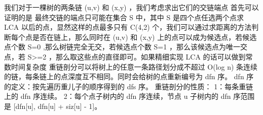 \markdownRendererInterblockSeparator
{}我们对于一棵树的两条链\markdownRendererDollarSign{} (u,v) \markdownRendererDollarSign{}和\markdownRendererDollarSign{} (x,y) \markdownRendererDollarSign{}，我们考虑求出它们的交链端点\markdownRendererParagraphSeparator
{}首先可以证明的是 最终交链的端点只可能在集合\markdownRendererDollarSign{} S \markdownRendererDollarSign{}中，其中\markdownRendererDollarSign{} S \markdownRendererDollarSign{}是四个点任选两个点求\markdownRendererDollarSign{} LCA \markdownRendererDollarSign{}以后的点，显然这样的点最多只有\markdownRendererDollarSign{} C(4,2) \markdownRendererDollarSign{}个，我们可以通过求距离的方法判断每个点是否在链上，那么同时在\markdownRendererDollarSign{} (u,v) \markdownRendererDollarSign{}和\markdownRendererDollarSign{} (x,y) \markdownRendererDollarSign{}上的点可以成为候选点，若候选点个数\markdownRendererDollarSign{} \markdownRendererPipe{}S\markdownRendererPipe{}=0 \markdownRendererDollarSign{},那么树链完全无交，若候选点个数\markdownRendererDollarSign{} \markdownRendererPipe{}S\markdownRendererPipe{}=1 \markdownRendererDollarSign{}，那么该候选点为唯一交点，若\markdownRendererDollarSign{} \markdownRendererPipe{}S\markdownRendererPipe{}>=2 \markdownRendererDollarSign{}，那么取这些点的直径即可。如果精细实现\markdownRendererDollarSign{} LCA \markdownRendererDollarSign{}的话可以做到常数时间复杂度\markdownRendererInterblockSeparator
{}\markdownRendererInterblockSeparator
{}
\markdownRendererSectionEnd \markdownRendererSectionBegin
{}\markdownRendererInterblockSeparator
{}重链剖分可以将树上的任意一条路径划分成不超过 \markdownRendererDollarSign{}O(\markdownRendererBackslash{}log n)\markdownRendererDollarSign{} 条连续的链，每条链上的点深度互不相同。同时会给树的点重新编号为 \markdownRendererDollarSign{}dfn\markdownRendererDollarSign{} 序。\markdownRendererParagraphSeparator
{}\markdownRendererDollarSign{}dfn\markdownRendererDollarSign{} 序的定义：按先遍历重儿子的顺序得到的 \markdownRendererDollarSign{}dfs\markdownRendererDollarSign{} 序。\markdownRendererParagraphSeparator
{}重链剖分的性质：\markdownRendererParagraphSeparator
{}1：每条重链上的 \markdownRendererDollarSign{}dfn\markdownRendererDollarSign{} 序连续。\markdownRendererHardLineBreak
{}2：每个点子树内的 \markdownRendererDollarSign{}dfn\markdownRendererDollarSign{} 序连续，节点 \markdownRendererDollarSign{}u\markdownRendererDollarSign{} 子树内的 \markdownRendererDollarSign{}dfn\markdownRendererDollarSign{} 序范围是 \markdownRendererDollarSign{}[dfn[u], dfn[u] + siz[u] - 1]\markdownRendererDollarSign{}。\markdownRendererHardLineBreak
